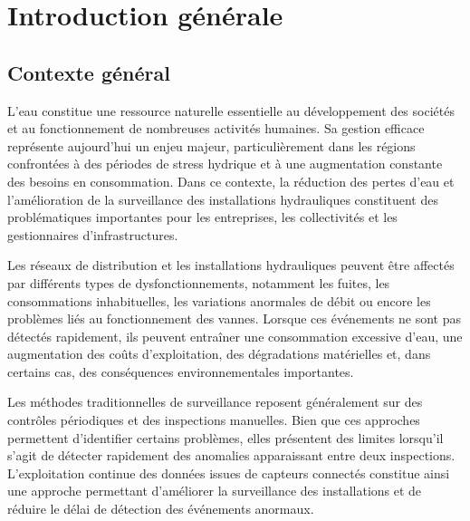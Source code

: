 
\chapter{Introduction générale}


\section{Contexte général}

L'eau constitue une ressource naturelle essentielle au développement des sociétés
et au fonctionnement de nombreuses activités humaines. Sa gestion efficace
représente aujourd'hui un enjeu majeur, particulièrement dans les régions
confrontées à des périodes de stress hydrique et à une augmentation constante
des besoins en consommation. Dans ce contexte, la réduction des pertes d'eau
et l'amélioration de la surveillance des installations hydrauliques constituent
des problématiques importantes pour les entreprises, les collectivités et les
gestionnaires d'infrastructures.

Les réseaux de distribution et les installations hydrauliques peuvent être
affectés par différents types de dysfonctionnements, notamment les fuites,
les consommations inhabituelles, les variations anormales de débit ou encore
les problèmes liés au fonctionnement des vannes. Lorsque ces événements ne
sont pas détectés rapidement, ils peuvent entraîner une consommation excessive
d'eau, une augmentation des coûts d'exploitation, des dégradations matérielles
et, dans certains cas, des conséquences environnementales importantes.

Les méthodes traditionnelles de surveillance reposent généralement sur des
contrôles périodiques et des inspections manuelles. Bien que ces approches
permettent d'identifier certains problèmes, elles présentent des limites
lorsqu'il s'agit de détecter rapidement des anomalies apparaissant entre deux
inspections. L'exploitation continue des données issues de capteurs connectés
constitue ainsi une approche permettant d'améliorer la surveillance des
installations et de réduire le délai de détection des événements anormaux.

